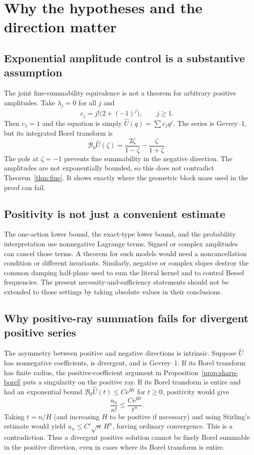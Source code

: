 \documentclass[11pt,a4paper]{article}
\numberwithin{equation}{section}
\theoremstyle{definition}
\theoremstyle{remark}
\theoremstyle{definition}
\newcommand{\U}{\widehat U}
\newcommand{\B}{\mathcal B_0}
\newcommand{\e}{\mathrm e}
\begin{document}
\section{Why the hypotheses and the direction matter}
\label{sec:boundaries}

\subsection{Exponential amplitude control is a substantive assumption}
The joint fine-summability equivalence is not a theorem for arbitrary
positive amplitudes. Take $\lambda_j=0$ for all $j$ and
\[
 c_j=j!\bigl(2+(-1)^j\bigr),\qquad j\ge1.
\]
Then $c_1=1$ and the equation is simply $\U(q)=\sum c_jq^j$.
The series is Gevrey--1, but its integrated Borel transform is
\begin{equation}
 \B\U(\zeta)=\frac{2\zeta}{1-\zeta}
                         -\frac{\zeta}{1+\zeta}.
 \label{eq:amplitude-counterexample}
\end{equation}
The pole at $\zeta=-1$ prevents fine summability in the negative
direction. The amplitudes are not exponentially bounded, so this does
not contradict Theorem~\ref{thm:fine}. It shows exactly where the
geometric block mass used in the proof can fail.

\subsection{Positivity is not just a convenient estimate}
The one-action lower bound, the exact-type lower bound, and the
probability interpretation use nonnegative Lagrange terms. Signed or
complex amplitudes can cancel those terms. A theorem for such models
would need a noncancellation condition or different invariants.
Similarly, negative or complex slopes destroy the common damping
half-plane used to sum the literal kernel and to control Bessel
frequencies. The present necessity-and-sufficiency statements should
not be extended to those settings by taking absolute values in their
conclusions.

\subsection{Why positive-ray summation fails for divergent positive series}
The asymmetry between positive and negative directions is intrinsic.
Suppose $\U$ has nonnegative coefficients, is divergent, and is
Gevrey--1. If its Borel transform has finite radius, the
positive-coefficient argument in Proposition~\ref{prop:sharp-borel}
puts a singularity on the positive ray. If its Borel transform is entire
and had an exponential bound $\B\U(t)\le C\e^{Ht}$ for $t\ge0$,
positivity would give
\[
 \frac{u_n}{n!}\le\frac{C\e^{Ht}}{t^n}.
\]
Taking $t=n/H$ (and increasing $H$ to be positive if necessary) and
using Stirling's estimate would yield
$u_n\le C'\sqrt n\,H^n$, forcing ordinary convergence. This is a
contradiction. Thus a divergent positive solution cannot be finely
Borel summable in the positive direction, even in cases where its
Borel transform is entire.
\end{document}
